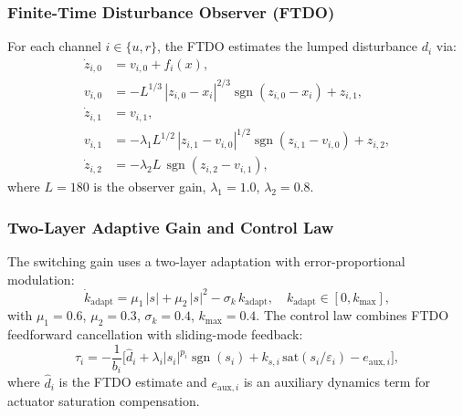 \documentclass[review]{cas-dc}
\begin{document}
\begin{appendices}
\subsubsection{Finite-Time Disturbance Observer (FTDO)}

For each channel $i \in \{u, r\}$, the FTDO estimates the lumped disturbance $d_i$ via:
\begin{align}
\dot{z}_{i,0} &= v_{i,0} + f_i(x), \label{eq:ftdo1}\\
v_{i,0} &= -L^{1/3}\,|z_{i,0} - x_i|^{2/3}\operatorname{sgn}(z_{i,0} - x_i) + z_{i,1}, \\
\dot{z}_{i,1} &= v_{i,1}, \\
v_{i,1} &= -\lambda_1 L^{1/2}\,|z_{i,1} - v_{i,0}|^{1/2}\operatorname{sgn}(z_{i,1} - v_{i,0}) + z_{i,2}, \\
\dot{z}_{i,2} &= -\lambda_2 L\,\operatorname{sgn}(z_{i,2} - v_{i,1}), \label{eq:ftdo5}
\end{align}
where $L = 180$ is the observer gain, $\lambda_1 = 1.0$, $\lambda_2 = 0.8$.

\subsubsection{Two-Layer Adaptive Gain and Control Law}

The switching gain uses a two-layer adaptation with error-proportional modulation:
\begin{equation}
\dot{k}_{\mathrm{adapt}} = \mu_1\,|s| + \mu_2\,|s|^2 - \sigma_k\, k_{\mathrm{adapt}}, \quad k_{\mathrm{adapt}} \in [0, k_{\max}],
\label{eq:fntsmc_adapt}
\end{equation}
with $\mu_1 = 0.6$, $\mu_2 = 0.3$, $\sigma_k = 0.4$, $k_{\max} = 0.4$. The control law combines FTDO feedforward cancellation with sliding-mode feedback:
\begin{equation}
\tau_i = -\frac{1}{b_i}\Big[\hat{d}_i + \lambda_i |s_i|^{p_i}\operatorname{sgn}(s_i) + k_{s,i}\,\mathrm{sat}(s_i/\varepsilon_i) - e_{\mathrm{aux},i}\Big],
\label{eq:fntsmc_ctrl}
\end{equation}
where $\hat{d}_i$ is the FTDO estimate and $e_{\mathrm{aux},i}$ is an auxiliary dynamics term for actuator saturation compensation.


\end{appendices}
\end{document}
